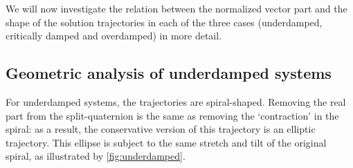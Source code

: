 We will now investigate the relation between the normalized vector part and the shape of the solution trajectories in each of the three cases (underdamped, critically damped and overdamped) in more detail.


\subsection{Geometric analysis of underdamped systems}
For underdamped systems, the trajectories are spiral-shaped. Removing the real part from the split-quaternion is the same as removing the `contraction' in the spiral: as a result, the conservative version of this trajectory is an elliptic trajectory. This ellipse is subject to the same stretch and tilt of the original spiral, as illustrated by \cref{fig:underdamped}. 

